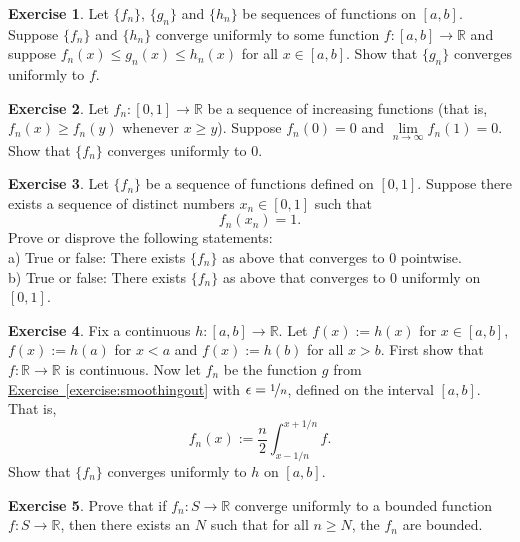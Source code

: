 \documentclass[12pt]{book}
\newcommand{\R}{{\mathbb{R}}}
\theoremstyle{plain}
\theoremstyle{remark}
\theoremstyle{definition}
\theoremstyle{exercise}
\newtheorem{exercise}{Exercise}[section]
\theoremstyle{example}
\newcommand{\exerciseref}[1]{\hyperref[#1]{Exercise~\ref*{#1}}}
\begin{document}
\begin{exercise}
Let $\{ f_n \}$, $\{ g_n \}$ and $\{ h_n \}$ be sequences of functions on
$[a,b]$.  Suppose $\{ f_n \}$ and $\{ h_n \}$ converge uniformly to some function
$f \colon [a,b] \to \R$ and suppose $f_n(x) \leq g_n(x) \leq h_n(x)$
for all $x \in [a,b]$.  Show that $\{ g_n \}$ converges uniformly to $f$.
\end{exercise}

\begin{exercise}
Let $f_n \colon [0,1] \to \R$ be a sequence of increasing functions (that
is, $f_n(x) \geq f_n(y)$ whenever $x \geq y$).  Suppose $f_n(0) = 0$
and $\lim\limits_{n \to \infty} f_n(1) = 0$.  Show that
$\{ f_n \}$
converges uniformly to $0$.
\end{exercise}

\begin{exercise}
Let $\{f_n\}$ be a sequence of functions defined on $[0,1]$.
Suppose there exists a sequence of distinct numbers $x_n \in [0,1]$ such that
\begin{equation*}
f_n(x_n) = 1 .
\end{equation*}
Prove or disprove the following statements:
\\
a)
True or false: There exists $\{ f_n \}$ as above that converges to $0$
pointwise.
\\
b)
True or false: There exists $\{ f_n \}$ as above that converges to $0$
uniformly on $[0,1]$.
\end{exercise}

\begin{exercise}
Fix a continuous $h \colon [a,b] \to \R$.
Let $f(x) := h(x)$ for $x \in [a,b]$,
$f(x) := h(a)$ for $x < a$ and $f(x) := h(b)$ for all $x > b$.  First show
that $f \colon \R \to \R$ is continuous.
Now let $f_n$ be
the function $g$ from \exerciseref{exercise:smoothingout} with
$\epsilon = \nicefrac{1}{n}$, defined on the interval $[a,b]$.  That is,
\begin{equation*}
f_n(x) := \frac{n}{2} \int_{x-1/n}^{x+1/n} f .
\end{equation*}
Show that $\{ f_n \}$ converges uniformly to $h$ on $[a,b]$.
\end{exercise}


\begin{exercise}
Prove that
if $f_n \colon S \to \R$
converge uniformly to a bounded function $f \colon S \to \R$,
then there exists an $N$ such that for all $n \geq N$, the $f_n$
are bounded.
\end{exercise}
\end{document}
